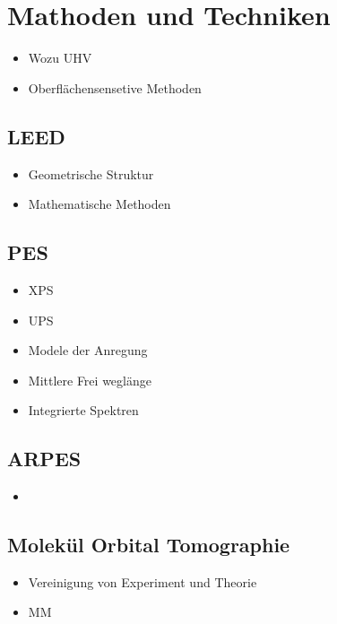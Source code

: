 \chapter{Mathoden und Techniken}
    \begin{itemize}
        \item Wozu UHV
        \item Oberflächensensetive Methoden
    \end{itemize}
\section{LEED}
    \begin{itemize}
        \item Geometrische Struktur
        \item Mathematische Methoden
    \end{itemize}
\section{PES}
    \begin{itemize}
        \item XPS
        \item UPS
        \item Modele der Anregung
        \item Mittlere Frei weglänge
        \item Integrierte Spektren
    \end{itemize}

\section{ARPES}
    \begin{itemize}
        \item 
    \end{itemize}

\section{Molekül Orbital Tomographie}
    \begin{itemize}
        \item Vereinigung von Experiment und Theorie
        \item MM
    \end{itemize}